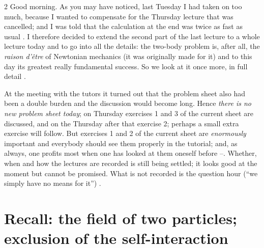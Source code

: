 \begin{paracol}{2}
Good morning. As you may have noticed, last Tuesday I had taken on too much, because I wanted to compensate for the Thursday lecture that was cancelled; and I was told that the calculation at the end was twice as fast as usual .
I therefore decided to extend the second part of the last lecture to a whole lecture today and to go into all the details: the two-body problem is, after all, the \emph{raison d'\^etre} of Newtonian mechanics (it was originally made for it) and to this day its greatest really fundamental success. So we look at it once more, in full detail .

\begin{coursenote}\label{cn:tb-org}
At the meeting with the tutors it turned out that the problem sheet also had been a double burden and the discussion would become long. Hence \emph{there is no new problem sheet today}; on Thursday exercises 1 and 3 of the current sheet are discussed, and on the Thursday after that exercise 2; perhaps a small extra exercise will follow. But exercises 1 and 2 of the current sheet are \emph{enormously} important and everybody should see them properly in the tutorial; and, as always, one profits most when one has looked at them oneself before --.
Whether, when and how the lectures are recorded is still being settled; it looks good at the moment but cannot be promised. What is not recorded is the question hour (``we simply have no means for it'') .
\end{coursenote}

\section{Recall: the field of two particles; exclusion of the self-interaction}\label{sec:tb-recall}


\end{paracol}
